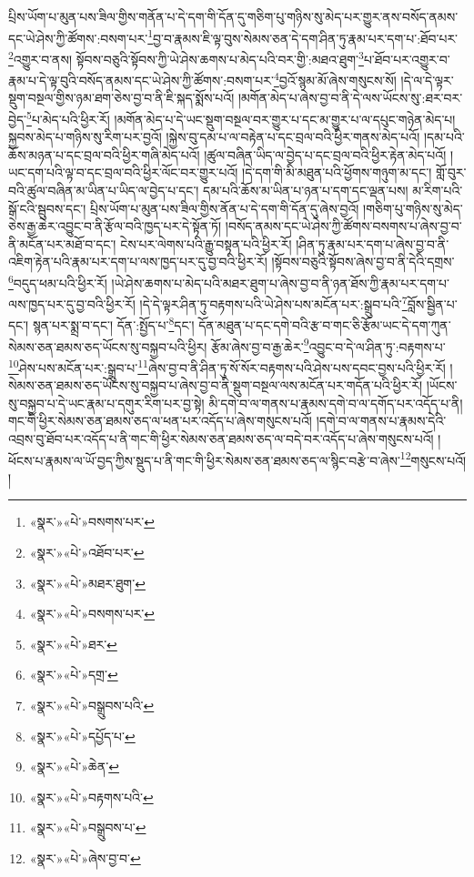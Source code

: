 པྲིས་ཡོག་པ་མུན་པས་ཟིལ་གྱིས་གནོན་པ་དེ་དག་གི་དོན་དུ་གཅིག་པུ་གཉིས་སུ་མེད་པར་གྱུར་ནས་བསོད་ནམས་དང་ཡེ་ཤེས་ཀྱི་ཚོགས་:བསག་པར་\footnote{«སྣར་»«པེ་»བསགས་པར་}བྱ་བ་རྣམས་ཇི་ལྟ་བུས་སེམས་ཅན་དེ་དག་ཤིན་ཏུ་རྣམ་པར་དག་པ་:ཐོབ་པར་\footnote{«སྣར་»«པེ་»འཐོབ་པར་}འགྱུར་བ་ནས། སྟོབས་བཅུའི་སྟོབས་ཀྱི་ཡེ་ཤེས་ཆགས་པ་མེད་པའི་བར་གྱི་:མཐའ་ཐུག་\footnote{«སྣར་»«པེ་»མཐར་ཐུག་}པ་ཐོབ་པར་འགྱུར་བ་རྣམ་པ་དེ་ལྟ་བུའི་བསོད་ནམས་དང་ཡེ་ཤེས་ཀྱི་ཚོགས་:བསག་པར་\footnote{«སྣར་»«པེ་»བསགས་པར་}བྱའོ་སྙམ་མོ་ཞེས་གསུངས་སོ། །དེ་ལ་དེ་ལྟར་སྡུག་བསྔལ་གྱིས་ཉམ་ཐག་ཅེས་བྱ་བ་ནི་ཇི་སྐད་སྨོས་པའོ། །མགོན་མེད་པ་ཞེས་བྱ་བ་ནི་དེ་ལས་ཡོངས་སུ་:ཐར་བར་བྱེད་\footnote{«སྣར་»«པེ་»ཐར་}པ་མེད་པའི་ཕྱིར་རོ། །མགོན་མེད་པ་དེ་ཡང་སྡུག་བསྔལ་བར་གྱུར་པ་དང་མ་གྱུར་པ་ལ་དཔུང་གཉེན་མེད་པ། སྐྱབས་མེད་པ་གཉིས་སུ་རིག་པར་བྱའོ། །སྐྱེས་བུ་དམ་པ་ལ་བརྟེན་པ་དང་བྲལ་བའི་ཕྱིར་གནས་མེད་པའོ། །དམ་པའི་ཆོས་མཉན་པ་དང་བྲལ་བའི་ཕྱིར་གཞི་མེད་པའོ། །ཚུལ་བཞིན་ཡིད་ལ་བྱེད་པ་དང་བྲལ་བའི་ཕྱིར་རྟེན་མེད་པའོ། །ཡང་དག་པའི་ལྟ་བ་དང་བྲལ་བའི་ཕྱིར་ལོང་བར་གྱུར་པའོ། །དེ་དག་གི་མི་མཐུན་པའི་ཕྱོགས་གཉུག་མ་དང་། གློ་བུར་བའི་ཚུལ་བཞིན་མ་ཡིན་པ་ཡིད་ལ་བྱེད་པ་དང་། དམ་པའི་ཆོས་མ་ཡིན་པ་ཉན་པ་དག་དང་ལྡན་པས། མ་རིག་པའི་སྒོ་ངའི་སྦུབས་དང་། པྲིས་ཡོག་པ་མུན་པས་ཟིལ་གྱིས་ནོན་པ་དེ་དག་གི་དོན་དུ་ཞེས་བྱའོ། །གཅིག་པུ་གཉིས་སུ་མེད་ཅེས་རྒྱ་ཆེར་འབྱུང་བ་ནི་རྩོལ་བའི་ཁྱད་པར་དེ་སྟོན་ཏོ། །བསོད་ནམས་དང་ཡེ་ཤེས་ཀྱི་ཚོགས་བསགས་པ་ཞེས་བྱ་བ་ནི་མངོན་པར་མཐོ་བ་དང་། ངེས་པར་ལེགས་པའི་རྒྱུ་བསྟན་པའི་ཕྱིར་རོ། །ཤིན་ཏུ་རྣམ་པར་དག་པ་ཞེས་བྱ་བ་ནི་འཇིག་རྟེན་པའི་རྣམ་པར་དག་པ་ལས་ཁྱད་པར་དུ་བྱ་བའི་ཕྱིར་རོ། །སྟོབས་བཅུའི་སྟོབས་ཞེས་བྱ་བ་ནི་དེའི་དགྲས་\footnote{«སྣར་»«པེ་»དགྲ་}བདུད་ཕམ་པའི་ཕྱིར་རོ། །ཡེ་ཤེས་ཆགས་པ་མེད་པའི་མཐར་ཐུག་པ་ཞེས་བྱ་བ་ནི་ཉན་ཐོས་ཀྱི་རྣམ་པར་དག་པ་ལས་ཁྱད་པར་དུ་བྱ་བའི་ཕྱིར་རོ། །དེ་དེ་ལྟར་ཤིན་ཏུ་བརྟགས་པའི་ཡེ་ཤེས་པས་མངོན་པར་:སྒྲུབ་པའི་\footnote{«སྣར་»«པེ་»བསྒྲུབས་པའི་}བློས་སྦྱིན་པ་དང་། སྙན་པར་སྨྲ་བ་དང་། དོན་:སྤྱོད་པ་\footnote{«སྣར་»«པེ་»དཔྱོད་པ་}དང་། དོན་མཐུན་པ་དང་དགེ་བའི་རྩ་བ་གང་ཅི་རྩོམ་ཡང་དེ་དག་ཀུན་སེམས་ཅན་ཐམས་ཅད་ཡོངས་སུ་བསྐྱབ་པའི་ཕྱིར། རྩོམ་ཞེས་བྱ་བ་རྒྱ་ཆེར་\footnote{«སྣར་»«པེ་»ཆེན་}འབྱུང་བ་དེ་ལ་ཤིན་ཏུ་:བརྟགས་པ་\footnote{«སྣར་»«པེ་»བརྟགས་པའི་}ཤེས་པས་མངོན་པར་:སྒྲུབ་པ་\footnote{«སྣར་»«པེ་»བསྒྲུབས་པ་}ཞེས་བྱ་བ་ནི་ཤིན་ཏུ་སོ་སོར་བརྟགས་པའི་ཤེས་པས་དབང་བྱས་པའི་ཕྱིར་རོ། །སེམས་ཅན་ཐམས་ཅད་ཡོངས་སུ་བསྐྱབ་པ་ཞེས་བྱ་བ་ནི་སྡུག་བསྔལ་ལས་མངོན་པར་གདོན་པའི་ཕྱིར་རོ། །ཡོངས་སུ་བསྐྱབ་པ་དེ་ཡང་རྣམ་པ་དགུར་རིག་པར་བྱ་སྟེ། མི་དགེ་བ་ལ་གནས་པ་རྣམས་དགེ་བ་ལ་དགོད་པར་འདོད་པ་ནི། གང་གི་ཕྱིར་སེམས་ཅན་ཐམས་ཅད་ལ་ཕན་པར་འདོད་པ་ཞེས་གསུངས་པའོ། །དགེ་བ་ལ་གནས་པ་རྣམས་དེའི་འབྲས་བུ་ཐོབ་པར་འདོད་པ་ནི་གང་གི་ཕྱིར་སེམས་ཅན་ཐམས་ཅད་ལ་བདེ་བར་འདོད་པ་ཞེས་གསུངས་པའོ། །ཕོངས་པ་རྣམས་ལ་ཡོ་བྱད་ཀྱིས་སྡུད་པ་ནི་གང་གི་ཕྱིར་སེམས་ཅན་ཐམས་ཅད་ལ་སྙིང་བརྩེ་བ་ཞེས་\footnote{«སྣར་»«པེ་»ཞེས་བྱ་བ་}གསུངས་པའོ། །
